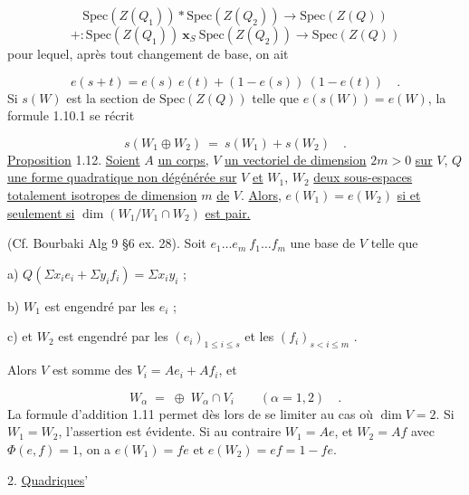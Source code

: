 \begin{equation}\tag{1.11.1}
\mathrm{Spec}(Z(Q_1)) * \mathrm{Spec}(Z(Q_2)) \longrightarrow \mathrm{Spec}(Z(Q))
\end{equation}
\begin{equation*}
+ : \mathrm{Spec}(Z(Q_1))\ \mathbf{x}_S\ \mathrm{Spec}(Z(Q_2)) \longrightarrow \mathrm{Spec}(Z(Q))
\end{equation*}
pour lequel, après tout changement de base, on ait

\begin{equation*}
e(s + t) = e(s)\ e(t) + (1 - e(s))\ (1 - e(t)) \quad .
\end{equation*}
Si $s(W)$ est la section de $\mathrm{Spec}(Z(Q))$ telle que $e(s(W)) = e(W)$, la formule 1.10.1 se récrit

\begin{equation*}
s(W_1 \oplus W_2)\ =\ s(W_1) + s(W_2) \quad .
\end{equation*}
\underline{Proposition} 1.12. \underline{Soient} $A$ \underline{un corps,} $V$ \underline{un vectoriel de dimension} $2m > 0$ \underline{sur} $V$, $Q$ \underline{une forme quadratique non dégénérée sur} $V$ \underline{et} $W_1$, $W_2$ \underline{deux sous-espaces totalement isotropes de dimension} $m$ \underline{de} $V$. \underline{Alors}, $e(W_1) = e(W_2)$ \underline{si et seulement si} $\dim(W_1/W_1 \cap W_2)$ \underline{est pair.}



(Cf. Bourbaki Alg 9 \S 6 ex. 28). Soit $e_1 \dots e_m\ f_1 \dots f_m$ une base de $V$ telle que

a) \qquad $Q( \Sigma x_i e_i + \Sigma y_i f_i) = \Sigma x_i y_i$ ;

b) \qquad $W_1$ est engendré par les $e_i$ ;

c) \qquad et $W_2$ est engendré par les $(e_i)_{1 \leqslant i \leqslant s}$ et les $(f_i)_{s < i \leqslant m}$ .

Alors $V$ est somme des $V_i = A e_i + A f_i$, et

\begin{equation*}
W_\alpha \;=\; \oplus \; W_\alpha \cap V_i \qquad (\alpha = 1,2) \quad .
\end{equation*}
La formule d'addition 1.11 permet dès lors de se limiter au cas où $\dim V = 2$. Si $W_1 = W_2$, l'assertion est évidente. Si au contraire $W_1 = Ae$, et $W_2 = Af$ avec $\Phi(e,f) = 1$, on a $e(W_1) = fe$ et $e(W_2) = ef = 1 - fe$.


2. \underline{Quadriques}'

